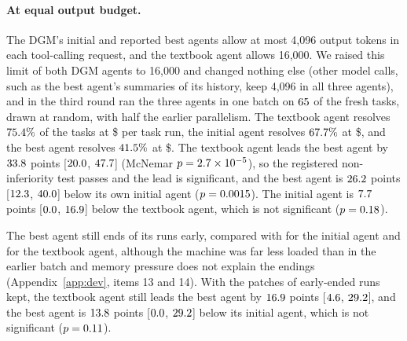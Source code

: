 \paragraph{At equal output budget.}\label{sec:swe-equal} The DGM's initial and reported best agents allow at
most 4{,}096 output tokens in each tool-calling request, and the textbook agent allows 16{,}000. We raised this limit of
both DGM agents to 16{,}000 and changed nothing else (other model calls, such as the best agent's summaries of its history, keep 4{,}096 in all three agents), and in the third round ran the
three agents in one batch on $65$ of the fresh tasks, drawn at random, with half the earlier parallelism. The textbook
agent resolves $75.4\%$ of the tasks at \$\wMovesUsd{} per task run, the initial agent resolves $67.7\%$
at \$\wInitUsd{}, and the best agent resolves $41.5\%$ at \$\wBestUsd{}. The textbook agent leads the best agent by
$33.8$ points [$20.0$, $47.7$] (McNemar $p=2.7\times10^{-5}$), so the registered
non-inferiority test passes and the lead is significant, and the best agent is $26.2$ points
[$12.3$, $40.0$] below its own initial agent ($p=0.0015$). The initial agent is
$7.7$ points [$0.0$, $16.9$] below the textbook agent, which is not significant
($p=0.18$).

The best agent still ends \wBestEarly{} of its \wN{} runs early, compared with \wInitEarly{} for the initial agent and
\wMovesEarly{} for the textbook agent, although the machine was far less loaded than in the earlier batch and memory
pressure does not explain the endings (Appendix~\ref{app:dev}, items 13 and 14). With the patches of early-ended runs
kept, the textbook agent still leads the best agent by $16.9$ points [$4.6$,
$29.2$], and the best agent is $13.8$ points [$0.0$, $29.2$] below its
initial agent, which is not significant ($p=0.11$).
